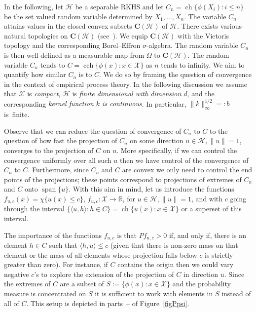 \documentclass[10pt]{amsart}
\theoremstyle{definition}\newtheorem{defi}[theo]{Definition}\newtheorem{rema}[theo]{Remark}\newtheorem{exam}[theo]{Example}\newtheorem{exem}[theo]{Example}\newtheorem{nota}[theo]{Notation}
\theoremstyle{remark}
\DeclareMathOperator{\cch}{cch}
\DeclareMathOperator{\ch}{ch}
\DeclareMathOperator{\spn}{span}
\newcommand{\R}{\mathbb{R}}
\newcommand{\bfC}{\mathbf{C}}
\newcommand{\X}{\mathcal{X}}
\newcommand{\cH}{\mathcal{H}}
\begin{document}
In the following, let $\cH$ be a separable RKHS and let $C_n = \ch \{\phi(X_i) : i \leq n \}$ be the set valued random variable determined by $X_1,\dots, X_n$. The variable $C_n$ attains values in the closed convex subsets $\bfC(\cH)$ of $\cH$. There exists various natural topologies on $\bfC(\cH)$ (see~\cite{BEER93}). We equip $\bfC(\cH)$ with the Vietoris topology and the corresponding Borel--Effron $\sigma$-algebra. The random variable $C_n$ is then well defined as a measurable map from $\Omega$ to $\bfC(\cH)$. The random variable $C_n$ tends to $C = \cch\{ \phi(x) : x \in \X \}$ as $n$ tends to infinity. We aim to quantify how similar $C_n$ is to $C$. We do so by framing the question of convergence in the context of empirical process theory. In the following discussion we assume that $\X$ is \emph{compact}, $\cH$ is \emph{finite dimensional with dimension $d$}, and the corresponding \emph{kernel function $k$ is continuous}. In particular, $\|k\|_\infty^{1/2} =: b$ is~finite.

Observe that we can reduce the question of convergence of $C_n$ to $C$ to the question of how fast the projection of $C_n$ on some direction $u \in \cH, \|u\| =1$, converges to the projection of $C$ on $u$. More specifically, if we can control the convergence uniformly over all such $u$ then we have control of the convergence of $C_n$ to $C$. Furthermore, since $C_n$ and $C$ are convex we only need to control the end points of the projections; these points correspond to projections of extremes of $C_n$ and $C$ onto $\spn\{u\}$. With this aim in mind, let us introduce the functions $f_{u,c}(x)=\chi\{ u(x) \leq c \}$, $f_{u,c} : \X \rightarrow \R$, for $u\in \cH, \|u\| =1$, and with $c$ going through the interval $\{\langle u, h \rangle : h\in C \} = \ch \{ u(x) : x \in \X \}$ or a superset of this interval.

The importance of the functions $f_{u,c}$ is that $P f_{u,c} > 0$ if, and only if, there is an element $h\in C$ such that $\langle h,u \rangle \leq c$ (given that there is non-zero mass on that element or the mass of all elements whose projection falls below $c$ is strictly greater than zero). For instance, if $C$ contains the origin then we could vary negative $c$'s to explore the extension of the projection of $C$ in direction $u$. Since the extremes of $C$ are a subset of $S := \{ \phi(x) : x \in \X\}$ and the probability measure is concentrated on $S$ it is sufficient to work with elements in $S$ instead of all of $C$. This setup is depicted in parts~-- of Figure~\ref{figPpsi}.
\end{document}
